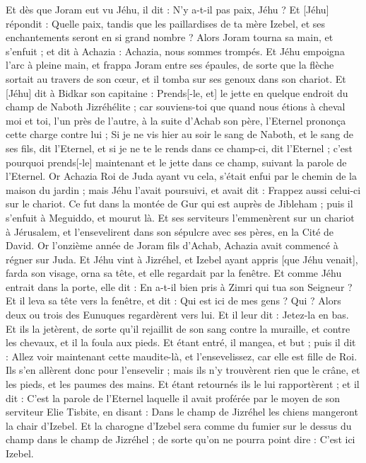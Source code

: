 \begin{multicols}{2}
Et dès que Joram eut vu Jéhu, il dit : N'y a-t-il pas paix, Jéhu ? Et [Jéhu] répondit : Quelle paix, tandis que les paillardises de ta mère Izebel, et ses enchantements seront en si grand nombre ?
Alors Joram tourna sa main, et s'enfuit ; et dit à Achazia : Achazia, nous sommes trompés.
Et Jéhu empoigna l'arc à pleine main, et frappa Joram entre ses épaules, de sorte que la flèche sortait au travers de son cœur, et il tomba sur ses genoux dans son chariot.
Et [Jéhu] dit à Bidkar son capitaine : Prends[-le, et] le jette en quelque endroit du champ de Naboth Jizréhélite ; car souviens-toi que quand nous étions à cheval moi et toi, l'un près de l'autre, à la suite d'Achab son père, l'Eternel prononça cette charge contre lui ;
Si je ne vis hier au soir le sang de Naboth, et le sang de ses fils, dit l'Eternel, et si je ne te le rends dans ce champ-ci, dit l'Eternel ; c'est pourquoi prends[-le] maintenant et le jette dans ce champ, suivant la parole de l'Eternel.
Or Achazia Roi de Juda ayant vu cela, s'était enfui par le chemin de la maison du jardin ; mais Jéhu l'avait poursuivi, et avait dit : Frappez aussi celui-ci sur le chariot. Ce fut dans la montée de Gur qui est auprès de Jibleham ; puis il s'enfuit à Meguiddo, et mourut là.
Et ses serviteurs l'emmenèrent sur un chariot à Jérusalem, et l'ensevelirent dans son sépulcre avec ses pères, en la Cité de David.
Or l'onzième année de Joram fils d'Achab, Achazia avait commencé à régner sur Juda.
Et Jéhu vint à Jizréhel, et Izebel ayant appris [que Jéhu venait], farda son visage, orna sa tête, et elle regardait par la fenêtre.
Et comme Jéhu entrait dans la porte, elle dit : En a-t-il bien pris à Zimri qui tua son Seigneur ?
Et il leva sa tête vers la fenêtre, et dit : Qui est ici de mes gens ? Qui ? Alors deux ou trois des Eunuques regardèrent vers lui.
Et il leur dit : Jetez-la en bas. Et ils la jetèrent, de sorte qu'il rejaillit de son sang contre la muraille, et contre les chevaux, et il la foula aux pieds.
Et étant entré, il mangea, et but ; puis il dit : Allez voir maintenant cette maudite-là, et l'ensevelissez, car elle est fille de Roi.
Ils s'en allèrent donc pour l'ensevelir ; mais ils n'y trouvèrent rien que le crâne, et les pieds, et les paumes des mains.
Et étant retournés ils le lui rapportèrent ; et il dit : C'est la parole de l'Eternel laquelle il avait proférée par le moyen de son serviteur Elie Tisbite, en disant : Dans le champ de Jizréhel les chiens mangeront la chair d'Izebel.
Et la charogne d'Izebel sera comme du fumier sur le dessus du champ dans le champ de Jizréhel ; de sorte qu'on ne pourra point dire : C'est ici Izebel.

\end{multicols}

